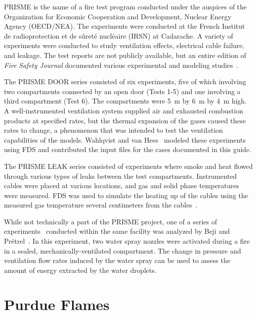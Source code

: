 PRISME is the name of a fire test program conducted under the auspices of the Organization for Economic Cooperation and Development, Nuclear Energy Agency (OECD/NEA). The experiments were conducted at the French Institut de radioprotection et de s\^{u}ret\'{e} nucl\'{e}aire (IRSN) at Cadarache. A variety of experiments were conducted to study ventilation effects, electrical cable failure, and leakage. The test reports are not publicly available, but an entire edition of {\em Fire Safety Journal} documented various experimental and modeling studies~\cite{Audouin:FSJ}.

The PRISME DOOR series consisted of six experiments, five of which involving two compartments connected by an open door (Tests 1-5) and one involving a third compartment (Test 6). The compartments were 5~m by 6~m by 4~m high. A well-instrumented ventilation system supplied air and exhausted combustion products at specified rates, but the thermal expansion of the gases caused these rates to change, a phenomenon that was intended to test the ventilation capabilities of the models. Wahlqvist and van Hees~\cite{Wahlqvist:FSJ} modeled these experiments using FDS and contributed the input files for the cases documented in this guide.

The PRISME LEAK series consisted of experiments where smoke and heat flowed through various types of leaks between the test compartments. Instrumented cables were placed at various locations, and gas and solid phase temperatures were measured. FDS was used to simulate the heating up of the cables using the measured gas temperature several centimeters from the cables~\cite{Dreisbach:Interflam}.

While not technically a part of the PRISME project, one of a series of experiments~\cite{Pretrel:FSJ2017} conducted within the same facility was analyzed by Beji and Pr\'{e}trel~\cite{Beji:FSJ2023}. In this experiment, two water spray nozzles were activated during a fire in a sealed, mechanically-ventilated compartment. The change in pressure and ventilation flow rates induced by the water spray can be used to assess the amount of energy extracted by the water droplets.

\section{Purdue Flames}
\label{Purdue_Flames_Description}

